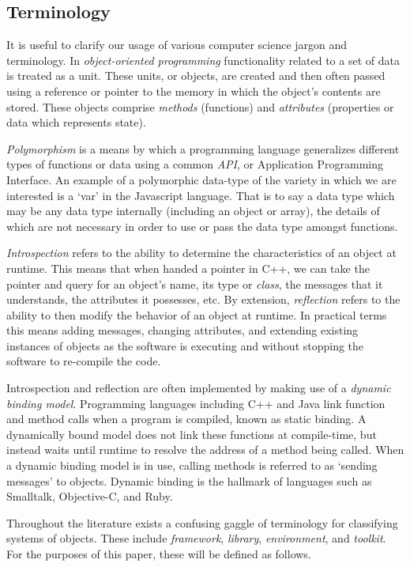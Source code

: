\documentclass[twoside,10pt]{article}
\begin{document}
\subsection{Terminology}

It is useful to clarify our usage of various computer science jargon and terminology.  In \emph{object-oriented programming} functionality related to a set of data is treated as a unit.  These units, or objects, are created and then often passed using a reference or pointer to the memory in which the object's contents are stored.  These objects comprise \emph{methods} (functions) and \emph{attributes} (properties or data which represents state).

\emph{Polymorphism} is a means by which a programming language generalizes different types of functions or data using a common \emph{API}, or Application Programming Interface.  An example of a polymorphic data-type of the variety in which we are interested is a `var' in the Javascript language.  That is to say a data type which may be any data type internally (including an object or array), the details of which are not necessary in order to use or pass the data type amongst functions.

\emph{Introspection} refers to the ability to determine the characteristics of an object at runtime.  This means that when handed a pointer in C++, we can take the pointer and query for an object's name, its type or \emph{class}, the messages that it understands, the attributes it possesses, etc.  By extension, \emph{reflection} refers to the ability to then modify the behavior of an object at runtime.  In practical terms this means adding messages, changing attributes, and extending existing instances of objects as the software is executing and without stopping the software to re-compile the code.

Introspection and reflection are often implemented by making use of a \emph{dynamic binding model}.  Programming languages including C++ and Java link function and method calls when a program is compiled, known as static binding.  A dynamically bound model does not link these functions at compile-time, but instead waits until runtime to resolve the address of a method being called.  When a dynamic binding model is in use, calling methods is referred to as `sending messages' to objects.  Dynamic binding is the hallmark of languages such as Smalltalk, Objective-C, and Ruby.

Throughout the literature exists a confusing gaggle of terminology for classifying systems of objects.  These include \emph{framework}, \emph{library}, \emph{environment}, and \emph{toolkit}.  For the purposes of this paper, these will be defined as follows.  
\end{document}

